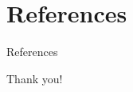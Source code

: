 \documentclass[11pt]{beamer}
\begin{document}
\section{References}

\begin{frame}[allowframebreaks]{References}
    \nocite{*}
    
\end{frame}

\begin{frame}

\begin{center}
    \Huge Thank you!
\end{center}

\begin{figure}[htb]
    \centering
\end{figure}

\end{frame}
\end{document}
